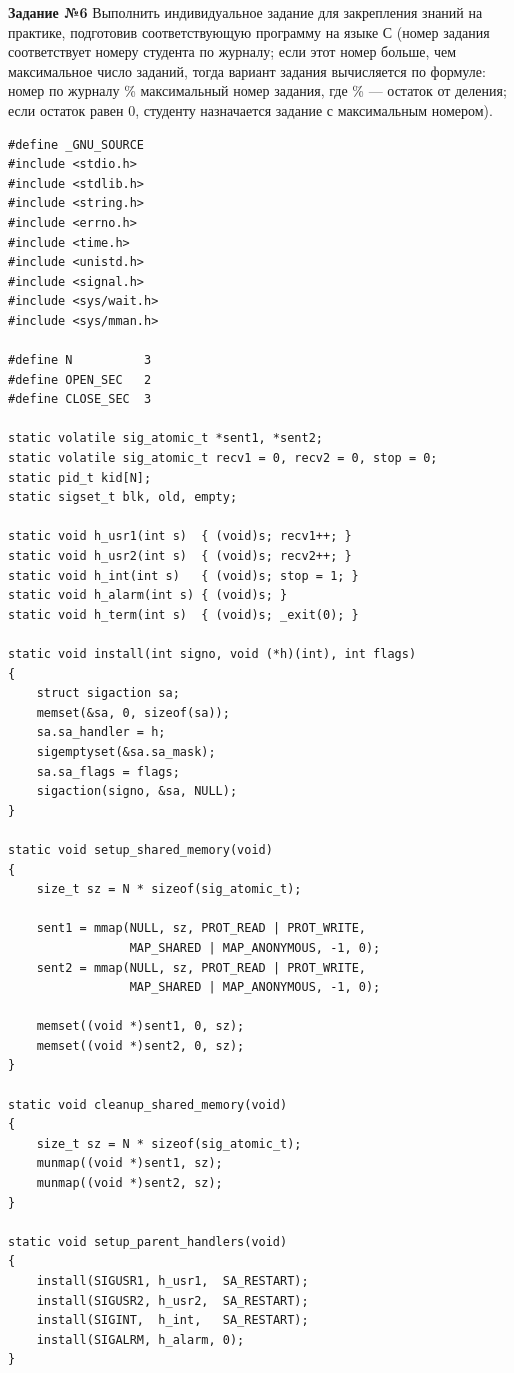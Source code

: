     \textbf{Задание №6} Выполнить индивидуальное задание для закрепления знаний на практике, подготовив соответствующую программу на языке С (номер задания соответствует номеру студента по журналу; если этот номер больше, чем максимальное число заданий, тогда вариант задания вычисляется по формуле: номер по журналу \% максимальный номер задания, где \% — остаток от деления; если остаток равен 0, студенту назначается задание с максимальным номером). \label{sec:6}

    \begin{verbatim}
#define _GNU_SOURCE
#include <stdio.h>
#include <stdlib.h>
#include <string.h>
#include <errno.h>
#include <time.h>
#include <unistd.h>
#include <signal.h>
#include <sys/wait.h>
#include <sys/mman.h>

#define N          3
#define OPEN_SEC   2
#define CLOSE_SEC  3

static volatile sig_atomic_t *sent1, *sent2;
static volatile sig_atomic_t recv1 = 0, recv2 = 0, stop = 0;
static pid_t kid[N];
static sigset_t blk, old, empty;

static void h_usr1(int s)  { (void)s; recv1++; }
static void h_usr2(int s)  { (void)s; recv2++; }
static void h_int(int s)   { (void)s; stop = 1; }
static void h_alarm(int s) { (void)s; }
static void h_term(int s)  { (void)s; _exit(0); }

static void install(int signo, void (*h)(int), int flags)
{
    struct sigaction sa;
    memset(&sa, 0, sizeof(sa));
    sa.sa_handler = h;
    sigemptyset(&sa.sa_mask);
    sa.sa_flags = flags;
    sigaction(signo, &sa, NULL);
}

static void setup_shared_memory(void)
{
    size_t sz = N * sizeof(sig_atomic_t);

    sent1 = mmap(NULL, sz, PROT_READ | PROT_WRITE,
                 MAP_SHARED | MAP_ANONYMOUS, -1, 0);
    sent2 = mmap(NULL, sz, PROT_READ | PROT_WRITE,
                 MAP_SHARED | MAP_ANONYMOUS, -1, 0);

    memset((void *)sent1, 0, sz);
    memset((void *)sent2, 0, sz);
}

static void cleanup_shared_memory(void)
{
    size_t sz = N * sizeof(sig_atomic_t);
    munmap((void *)sent1, sz);
    munmap((void *)sent2, sz);
}

static void setup_parent_handlers(void)
{
    install(SIGUSR1, h_usr1,  SA_RESTART);
    install(SIGUSR2, h_usr2,  SA_RESTART);
    install(SIGINT,  h_int,   SA_RESTART);
    install(SIGALRM, h_alarm, 0);
}


\end{verbatim}
